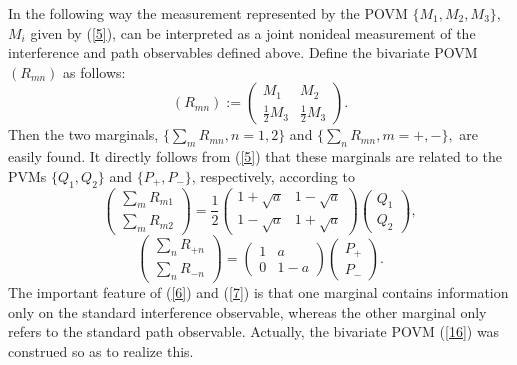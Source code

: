 \documentclass{ws-procs975x65}
\begin{document}
{In the following way the measurement represented by the POVM
$\{M_1,M_2,M_3\}$, $M_i$ given by (\ref{5}), can be interpreted as
a joint nonideal measurement of the interference and path
observables defined above. Define the bivariate POVM $(R_{mn})$ as
follows:
\begin{equation} \label{16} (R_{mn}):=\left(\begin{array}{cc}
M_1 & M_2\\
\frac{1}{2}M_{3} & \frac{1}{2}M_{3}
\end{array}\right).\end{equation}
Then the two marginals, $\{\sum_{m} R_{mn}, n=1,2\}$ and
$\{\sum_{n} R_{mn}, m=+,-\},$ are easily found. It directly
follows from (\ref{5}) that these marginals are related to the
PVMs $\{Q_1,Q_2\}$ and $\{P_+,P_-\}$, respectively, according to
\begin{equation}\label{6}\left(\begin{array}{c}
\sum_{m} R_{m1}\\
\sum_{m} R_{m2}\end{array}\right) =\frac{1}{2}
\left(\begin{array}{cc}
1+\sqrt{a} & 1-\sqrt{a}\\
1-\sqrt{a} & 1+\sqrt{a}\end{array}\right) \left(\begin{array}{c}
Q_1\\
Q_2\end{array}\right), \end{equation}
 \begin{equation}\label{7}
\left(\begin{array}{c}
\sum_{n} R_{+n}\\
\sum_{n} R_{-n}\end{array}\right)= \left(\begin{array}{cc}
1 & a\\
0 & 1-a
\end{array}\right)
\left(\begin{array}{c}
P_+\\
P_-
\end{array}\right).\end{equation}
The important feature of (\ref{6}) and (\ref{7}) is that one
marginal contains information only on the standard interference
observable, whereas the other marginal only refers to the standard
path observable. Actually, the bivariate POVM (\ref{16}) was
construed so as to realize this.

}
\end{document}
